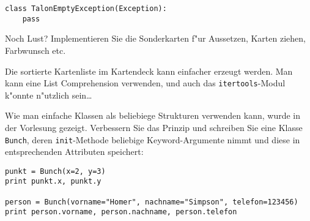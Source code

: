 \begin{aufgabe}
\begin{teilaufgabe}[Grundlagen]
\begin{lstlisting}
class TalonEmptyException(Exception):
    pass
\end{lstlisting}
\end{teilaufgabe}
\begin{teilaufgabe}[Spezialkarten]
Noch Lust? Implementieren Sie die Sonderkarten f"ur  Aussetzen, Karten ziehen, Farbwunsch etc.
\end{teilaufgabe}
\begin{teilaufgabe}[F"ur Profis]
Die sortierte Kartenliste im Kartendeck kann einfacher erzeugt werden. Man kann eine List Comprehension verwenden, und auch das \lstinline{itertools}-Modul k"onnte n"utzlich sein\dots
\end{teilaufgabe}
\end{aufgabe}

\begin{aufgabe}[F"ur Profis]
Wie man einfache Klassen als beliebiege Strukturen verwenden kann, wurde in der Vorlesung gezeigt. Verbessern Sie das Prinzip und schreiben Sie eine Klasse \lstinline{Bunch}, deren \lstinline{init}-Methode beliebige Keyword-Argumente nimmt und diese in entsprechenden Attributen speichert:
\begin{lstlisting}
punkt = Bunch(x=2, y=3)
print punkt.x, punkt.y

person = Bunch(vorname="Homer", nachname="Simpson", telefon=123456)
print person.vorname, person.nachname, person.telefon
\end{lstlisting}
\end{aufgabe}


